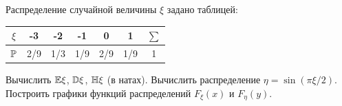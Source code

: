 
\renewcommand*{\proofname}{Решение}

\begin{problem}
Распределение случайной величины $\xi $ задано таблицей:
\begin{center}
\begin{table}[h!]
    \centering
    \begin{tabular}{|c|c|c|c|c|c|c|}
        \hline
        $\xi$ & -3 & -2 & -1 & 0 & 1 & $\sum$ \\
        \hline
        $\mathbb P$ & 2/9 & 1/3 & 1/9 & 2/9 & 1/9 & 1 \\
        \hline
    \end{tabular}
\end{table}
\end{center}
Вычислить $\mathbb E\xi $, $\mathbb D\xi $, $\mathbb H\xi $ (в натах). Вычислить распределение $ \eta = \sin(\pi\xi/2)$. Построить графики функций распределений $ F_{\xi}(x)$ и $ F_{\eta}(y)$.
\end{problem}

